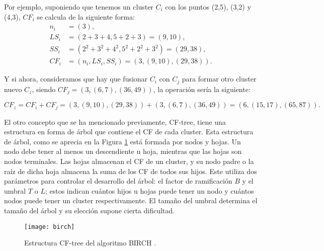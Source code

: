 \documentclass[10pt, a4paper]{article}
\begin{document}
Por ejemplo, suponiendo que tenemos un cluster $C_i$ con los puntos (2,5), (3,2) y (4,3), $CF_i$ se calcula de la siguiente forma: 
\begin{align*}
n_i &= \left (3 \right), \\
LS_i &= \left (2 + 3 + 4, 5 + 2 + 3 \right) =  \left (9, 10 \right), \\
SS_i &= \left (2^2 + 3^2 + 4^2 , 5^2 + 2^2 + 3^2 \right) = \left (29, 38 \right), \\
CF_i &=  \left(n_i, LS_i, SS_i \right )= \left (3, \left (9, 10 \right), \left (29, 38 \right) \right).  
\end{align*}

Y si ahora, consideramos que hay que fusionar $C_i$ con $C_j$ para formar otro cluster nuevo $C_z$, siendo $CF_j = \left(3, \left(6,7 \right), \left(36,49 \right) \right)$, la operación sería la siguiente:

\begin{comment}
\begin{align*}
&CF_z = CF_i + CF_j =
&= \left(3, \left (9, 10 \right), \left (29, 38 \right) \right) +\left(3, \left(6,7 \right), \left(36,49 \right) \right)= \\
&= \left(6, \left(15,17 \right), \left(65,87 \right) \right).
\end{align*}
\end{comment}

$$CF_z = CF_i + CF_j = \left(3, \left (9, 10 \right), \left (29, 38 \right) \right) +\left(3, \left(6,7 \right), \left(36,49 \right) \right) = \left(6, \left(15,17 \right), \left(65,87 \right) \right).$$


El otro concepto que se ha mencionado previamente, CF-tree, tiene una estructura en forma de árbol que contiene el CF de cada cluster. Esta estructura de árbol, como se aprecia en la Figura \ref{fig:birch} está formada por nodos y hojas. Un nodo debe tener al menos un descendiente u hoja, mientras que las hojas son nodos terminales. Las hojas  almacenan el CF de un cluster, y su nodo padre o la raíz de dicha hoja almacena la suma de los CF de todos sus hijos. Este utiliza dos parámetros para controlar el desarrollo del árbol: el factor de ramificación $B$ y el umbral $T$ o $L$; estos indican cuántos hijos u hojas puede tener un nodo y cuántos nodos puede tener un cluster respectivamente. El tamaño del umbral determina el tamaño del árbol y su elección supone cierta dificultad. 

\begin{figure}[ht]
\centering
\texttt{[image: birch]}
\caption{Estructura CF-tree del algoritmo BIRCH \cite{birchfoto}.}
\label{fig:birch}
\end{figure}
\end{document}
